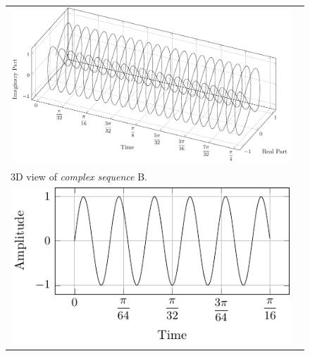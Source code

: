 \documentclass[../../course]{subfiles}
\begin{document}
\begin{figure} [H]

    \renewcommand{\arraystretch}{0.75}
    \centering
    \begin{NiceTabularX} {\textwidth} {
            *{2}{>{\centering\arraybackslash}X}
        }

         {
             {
                \includegraphics[height = \textheight] {tikzpics/plotComplexB.pdf}
            }
        }

        &
        \\

         {
            \vbox{
                 {3D view of \emph{complex sequence} B.}
                \label{plt:cmplxB}
            }
        }

        &
        \\

         {
             {
                \includegraphics[height = \textheight] {tikzpics/plotShortX1.pdf}
            }
        }

        &


\end{NiceTabularX}
\end{figure}
\end{document}
